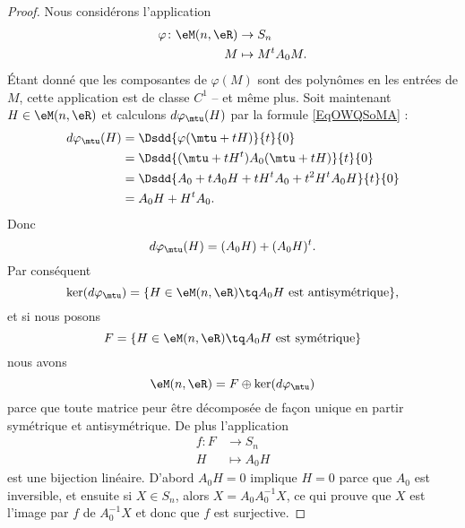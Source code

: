 \begin{proof}
	Nous considérons l'application
	\begin{equation}
		\begin{aligned}
			\varphi\colon \eM(n,\eR) & \to S_n          \\
			M                        & \mapsto M^tA_0M.
		\end{aligned}
	\end{equation}
	Étant donné que les composantes de \( \varphi(M)\) sont des polynômes en les entrées de \( M\), cette application est de classe \( C^1\) -- et même plus. Soit maintenant \( H\in \eM(n,\eR)\) et calculons \( d\varphi_{\mtu}(H)\) par la formule \eqref{EqOWQSoMA} :
	\begin{subequations}
		\begin{align}
			d\varphi_{\mtu}(H) & =\Dsdd{ \varphi(\mtu+tH) }{t}{0}             \\
			                   & =\Dsdd{ (\mtu+tH^t)A_0(\mtu+tH) }{t}{0}      \\
			                   & =\Dsdd{ A_0+tA_0H+tH^tA_0+t^2H^tA_0H }{t}{0} \\
			                   & =A_0H+H^tA_0.
		\end{align}
	\end{subequations}
	Donc
	\begin{equation}
		d\varphi_{\mtu}(H)=(A_0H)+(A_0H)^t.
	\end{equation}
	Par conséquent
	\begin{equation}
		\ker(d\varphi_{\mtu})=\{ H\in \eM(n,\eR)\tq A_0H\text{ est antisymétrique} \},
	\end{equation}
	et si nous posons
	\begin{equation}
		F=\{ H\in \eM(n,\eR)\tq A_0H\text{ est symétrique} \}
	\end{equation}
	nous avons
	\begin{equation}
		\eM(n,\eR)=F\oplus\ker(d\varphi_{\mtu})
	\end{equation}
	parce que toute matrice peur être décomposée de façon unique en partir symétrique et antisymétrique. De plus l'application
	\begin{equation}    \label{EqGTBusDm}
		\begin{aligned}
			f\colon F & \to S_n      \\
			H         & \mapsto A_0H
		\end{aligned}
	\end{equation}
	est une bijection linéaire. D'abord \( A_0H=0\) implique \( H=0\) parce que \( A_0\) est inversible, et ensuite si \( X\in S_n\), alors \( X=A_0A_0^{-1}X\), ce qui prouve que \( X\) est l'image par \( f\) de \( A_0^{-1}X\) et donc que \( f\) est surjective.


\end{proof}
